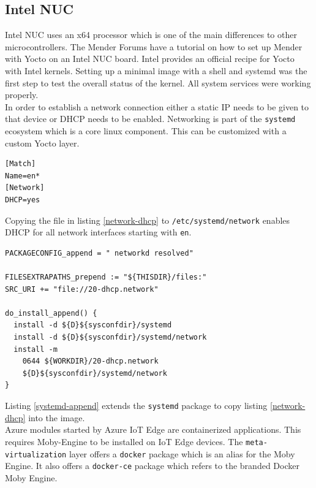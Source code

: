 \subsection{Intel NUC}
Intel NUC uses an x64 processor which is one of the main differences to other microcontrollers. The Mender Forums have a tutorial on how to set up Mender with Yocto on an Intel NUC board.\cite{intel-mender-yocto} Intel provides an official recipe for Yocto with Intel kernels. Setting up a minimal image with a shell and systemd was the first step to test the overall status of the kernel. All system services were working properly.\\
In order to establish a network connection either a static IP needs to be given to that device or DHCP needs to be enabled. Networking is part of the \verb|systemd| ecosystem which is a core linux component. This can be customized with a custom Yocto layer.
\begin{code}
  \label{network-dhcp}
  \begin{verbatim}
[Match]
Name=en*
[Network]
DHCP=yes
  \end{verbatim}
\end{code}
Copying the file in listing \ref{network-dhcp} to \verb|/etc/systemd/network| enables DHCP for all network interfaces starting with \verb|en|.
\begin{code}
  \label{systemd-append}
  \begin{verbatim}
PACKAGECONFIG_append = " networkd resolved"

FILESEXTRAPATHS_prepend := "${THISDIR}/files:"
SRC_URI += "file://20-dhcp.network"

do_install_append() {
  install -d ${D}${sysconfdir}/systemd
  install -d ${D}${sysconfdir}/systemd/network
  install -m 
    0644 ${WORKDIR}/20-dhcp.network
    ${D}${sysconfdir}/systemd/network
}
  \end{verbatim}
\end{code}
Listing \ref{systemd-append} extends the \verb|systemd| package to copy listing \ref{network-dhcp} into the image.\\
Azure modules started by Azure IoT Edge are containerized applications. This requires Moby-Engine to be installed on IoT Edge devices. The \verb|meta-virtualization| layer offers a \verb|docker| package which is an alias for the Moby Engine. It also offers a \verb|docker-ce| package which refers to the branded Docker Moby Engine.\\

